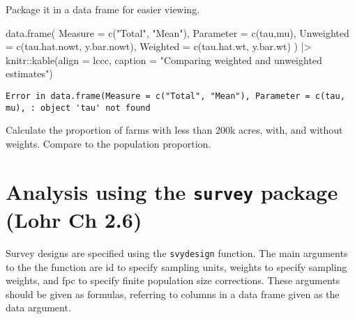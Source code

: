 \documentclass[
  letterpaper,
  DIV=11,
  numbers=noendperiod]{scrartcl}
\newenvironment{Shaded}{}{}
\newcommand{\AttributeTok}[1]{\textcolor[rgb]{0.84,0.23,0.29}{#1}}
\newcommand{\FunctionTok}[1]{\textcolor[rgb]{0.44,0.26,0.76}{#1}}
\newcommand{\NormalTok}[1]{\textcolor[rgb]{0.14,0.16,0.18}{#1}}
\newcommand{\SpecialCharTok}[1]{\textcolor[rgb]{0.00,0.36,0.77}{#1}}
\newcommand{\StringTok}[1]{\textcolor[rgb]{0.01,0.18,0.38}{#1}}
\begin{document}
Package it in a data frame for easier viewing.

\begin{Shaded}
\begin{Highlighting}[]
\FunctionTok{data.frame}\NormalTok{(}
  \AttributeTok{Measure =} \FunctionTok{c}\NormalTok{(}\StringTok{"Total"}\NormalTok{, }\StringTok{"Mean"}\NormalTok{), }
  \AttributeTok{Parameter =} \FunctionTok{c}\NormalTok{(tau,mu),}
  \AttributeTok{Unweighted =} \FunctionTok{c}\NormalTok{(tau.hat.nowt, y.bar.nowt), }
  \AttributeTok{Weighted =} \FunctionTok{c}\NormalTok{(tau.hat.wt, y.bar.wt)}
\NormalTok{  ) }\SpecialCharTok{|\textgreater{}}\NormalTok{ knitr}\SpecialCharTok{::}\FunctionTok{kable}\NormalTok{(}\AttributeTok{align =} \StringTok{\textquotesingle{}lccc\textquotesingle{}}\NormalTok{, }
             \AttributeTok{caption =} \StringTok{"Comparing weighted and unweighted estimates"}\NormalTok{)}
\end{Highlighting}
\end{Shaded}

\begin{verbatim}
Error in data.frame(Measure = c("Total", "Mean"), Parameter = c(tau, mu), : object 'tau' not found
\end{verbatim}

\begin{tcolorbox}[enhanced jigsaw, toptitle=1mm, breakable, colframe=quarto-callout-warning-color-frame, colbacktitle=quarto-callout-warning-color!10!white, left=2mm, titlerule=0mm, bottomtitle=1mm, title={You try it}, bottomrule=.15mm, rightrule=.15mm, arc=.35mm, toprule=.15mm, colback=white, opacityback=0, leftrule=.75mm, coltitle=black, opacitybacktitle=0.6]

Calculate the proportion of farms with less than 200k acres, with, and
without weights. Compare to the population proportion.

\end{tcolorbox}

\hypertarget{analysis-using-the-survey-package-lohr-ch-2.6}{%
\section{\texorpdfstring{Analysis using the \texttt{survey} package
(Lohr Ch
2.6)}{Analysis using the survey package (Lohr Ch 2.6)}}\label{analysis-using-the-survey-package-lohr-ch-2.6}}

Survey designs are specified using the \texttt{svydesign} function. The
main arguments to the the function are id to specify sampling units,
weights to specify sampling weights, and fpc to specify finite
population size corrections. These arguments should be given as
formulas, referring to columns in a data frame given as the data
argument.
\end{document}
